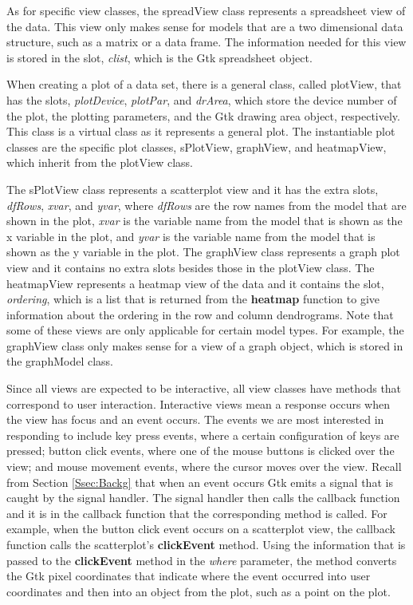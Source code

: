 \documentclass{article}[11pt]
\newcommand{\Rfunction}[1]{{\textbf{#1}}}
\newcommand{\Rslot}[1]{\textsl{#1}}
\newcommand{\Rclass}[1]{\textsf{#1}}
\begin{document}
As for specific view classes, the \Rclass{spreadView} class
represents a spreadsheet view of the data.  This view only makes sense for
models that are a two dimensional data structure, such as a matrix or a data
frame.  The information needed for this view is stored in the slot,
\Rslot{clist}, which is the Gtk spreadsheet object.

When creating a plot of a data set, there is a general class, called
\Rclass{plotView}, that has the slots, \Rslot{plotDevice}, \Rslot{plotPar},
and \Rslot{drArea}, which store the device number of the plot, the plotting
parameters, and the Gtk drawing area object, respectively.  This class is a
virtual class as it represents a general plot.  The instantiable plot classes
are the specific plot classes, \Rclass{sPlotView}, \Rclass{graphView}, and
\Rclass{heatmapView}, which inherit from the \Rclass{plotView} class.  

The \Rclass{sPlotView} class represents a scatterplot view and it has the
extra slots, \Rslot{dfRows}, \Rslot{xvar}, and \Rslot{yvar}, where
\Rslot{dfRows} are the row names from the model that are shown in the plot,
\Rslot{xvar} is the variable name from the model that is shown as the x
variable in the plot, and \Rslot{yvar} is the variable name from the model
that is shown as the y variable in the plot.  The \Rclass{graphView} class
represents a graph plot view and it contains no extra slots besides those in
the \Rclass{plotView} class.  The \Rclass{heatmapView} represents a heatmap
view of the data and it contains the slot, \Rslot{ordering}, which is a list
that is returned from the \Rfunction{heatmap} function to give information
about the ordering in the row and column dendrograms.  Note that some of these
views are only applicable for certain model types.  For example, the
\Rclass{graphView} class only makes sense for a view of a graph object,
which is stored in the \Rclass{graphModel} class. 

Since all views are expected to be interactive, all view classes have methods
that correspond to user interaction.  Interactive views mean a response
occurs when the view has focus and an event occurs.  The events we are most
interested in responding to include key press
events, where a certain configuration of keys are pressed; button click
events, where one of the mouse buttons is clicked over the view; and mouse
movement events, where the cursor moves over the view.  Recall from Section
\ref{Ssec:Backg} that when an event occurs Gtk emits a signal that is caught
by the signal handler.  The signal handler then calls the callback function
and it is in the callback function that the corresponding method is called.
For example, when the button click event occurs on a scatterplot view, the
callback function calls the scatterplot's \Rfunction{clickEvent} method.
Using the information that is passed to the \Rfunction{clickEvent} method in
the \Rslot{where} parameter, the method converts the Gtk pixel coordinates
that indicate where the event occurred into user coordinates and then into an
object from the plot, such as a point on the plot. 
\end{document}
